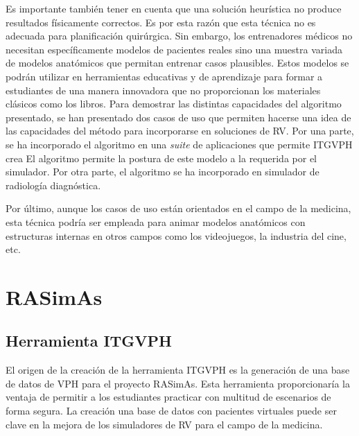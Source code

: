 Es importante también tener en cuenta que una solución heurística no produce resultados físicamente correctos. Es por esta razón que esta técnica no es adecuada para planificación quirúrgica. Sin embargo, los entrenadores médicos no necesitan específicamente modelos de pacientes reales sino una muestra variada de modelos anatómicos que permitan entrenar casos plausibles. Estos modelos se podrán utilizar en herramientas educativas y de aprendizaje para formar a estudiantes de una manera innovadora que no proporcionan los materiales clásicos como los libros.
Para demostrar las distintas capacidades del algoritmo presentado, se han presentado dos casos de uso que permiten hacerse una idea de las capacidades del método para incorporarse en soluciones de \ac{RV}. 
%
Por una parte, se ha incorporado el algoritmo en una \emph{suite} de aplicaciones que permite  
\ac{ITGVPH} crea  
El algoritmo permite 
 la postura de este modelo a la requerida por el simulador.
%
Por otra parte, el algoritmo se ha incorporado en simulador de radiología diagnóstica.  


Por último, aunque los casos de uso están orientados en el campo de la medicina, esta técnica podría ser empleada para animar modelos anatómicos con estructuras internas en otros campos como los videojuegos, la industria del cine, etc.
 

\section{RASimAs}


\subsection{Herramienta ITGVPH}
\label{conclu:herramienta}
El origen de la creación de la herramienta  \ac{ITGVPH} es la generación de una base de datos de \ac{VPH} para el proyecto \ac{RASimAs}. Esta herramienta proporcionaría la ventaja de permitir a los estudiantes practicar con multitud de escenarios de forma segura. La creación una base de datos con pacientes virtuales puede ser clave en la mejora de los simuladores de \ac{RV} para el campo de la medicina. 

